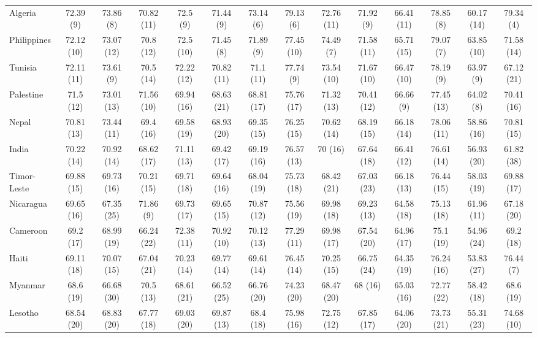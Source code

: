 \begin{landscape}
{\begin{longtable}{lccccccccccccc}
Algeria & 72.39 (9) & 73.86 (8) & 70.82 (11) & 72.5 (9) & 71.44 (9) & 73.14 (6) & 79.13 (6) & 72.76 (11) & 71.92 (9) & 66.41 (11) & 78.85 (8) & 60.17 (14) & 79.34 (4) \\ 
Philippines & 72.12 (10) & 73.07 (12) & 70.8 (12) & 72.5 (10) & 71.45 (8) & 71.89 (9) & 77.45 (10) & 74.49 (7) & 71.58 (11) & 65.71 (15) & 79.07 (7) & 63.85 (10) & 71.58 (14) \\ 
Tunisia & 72.11 (11) & 73.61 (9) & 70.5 (14) & 72.22 (12) & 70.82 (11) & 71.1 (11) & 77.74 (9) & 73.54 (10) & 71.67 (10) & 66.47 (10) & 78.19 (9) & 63.97 (9) & 67.12 (21) \\ 
Palestine & 71.5 (12) & 73.01 (13) & 71.56 (10) & 69.94 (16) & 68.63 (21) & 68.81 (17) & 75.76 (17) & 71.32 (13) & 70.41 (12) & 66.66 (9) & 77.45 (13) & 64.02 (8) & 70.41 (16) \\ 
Nepal & 70.81 (13) & 73.44 (11) & 69.4 (16) & 69.58 (19) & 68.93 (20) & 69.35 (15) & 76.25 (15) & 70.62 (14) & 68.19 (15) & 66.18 (14) & 78.06 (11) & 58.86 (16) & 70.81 (15) \\ 
India & 70.22 (14) & 70.92 (14) & 68.62 (17) & 71.11 (13) & 69.42 (17) & 69.19 (16) & 76.57 (13) & 70 (16) & 67.64 (18) & 66.41 (12) & 76.61 (14) & 56.93 (20) & 61.82 (38) \\ 
Timor-Leste & 69.88 (15) & 69.73 (16) & 70.21 (15) & 69.71 (18) & 69.64 (16) & 68.04 (19) & 75.73 (18) & 68.42 (21) & 67.03 (23) & 66.18 (13) & 76.44 (15) & 58.03 (19) & 69.88 (17) \\ 
Nicaragua & 69.65 (16) & 67.35 (25) & 71.86 (9) & 69.73 (17) & 69.65 (15) & 70.87 (12) & 75.56 (19) & 69.98 (18) & 69.23 (13) & 64.58 (18) & 75.13 (18) & 61.96 (11) & 67.18 (20) \\ 
Cameroon & 69.2 (17) & 68.99 (19) & 66.24 (22) & 72.38 (11) & 70.92 (10) & 70.12 (13) & 77.29 (11) & 69.98 (17) & 67.54 (20) & 64.96 (17) & 75.1 (19) & 54.96 (24) & 69.2 (18) \\ 
Haiti & 69.11 (18) & 70.07 (15) & 67.04 (21) & 70.23 (14) & 69.77 (14) & 69.61 (14) & 76.45 (14) & 70.25 (15) & 66.75 (24) & 64.35 (19) & 76.24 (16) & 53.83 (27) & 76.44 (7) \\ 
Myanmar & 68.6 (19) & 66.68 (30) & 70.5 (13) & 68.61 (21) & 66.52 (25) & 66.76 (20) & 74.23 (20) & 68.47 (20) & 68 (16) & 65.03 (16) & 72.77 (22) & 58.42 (18) & 68.6 (19) \\ 
Lesotho & 68.54 (20) & 68.83 (20) & 67.77 (18) & 69.03 (20) & 69.87 (13) & 68.4 (18) & 75.98 (16) & 72.75 (12) & 67.85 (17) & 64.06 (20) & 73.73 (21) & 55.31 (23) & 74.68 (10) \\ 

\end{longtable}}
\end{landscape}
